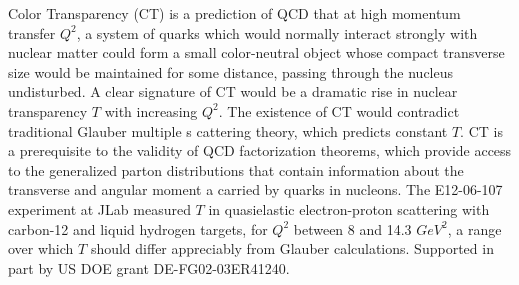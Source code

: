 \noindent
Color Transparency (CT) is a prediction of QCD that at high momentum transfer
$Q ^2$, a system of quarks which would normally interact strongly with nuclear
matter could form a small color-neutral object whose compact transverse size
would be maintained for some distance, passing through the nucleus undisturbed.
A clear signature of CT would be a dramatic rise in nuclear transparency $T$
with increasing $Q^2$. The existence of CT would contradict traditional Glauber
multiple s cattering theory, which predicts constant $T$. CT is a prerequisite
to the validity of QCD factorization theorems, which provide access to the
generalized parton distributions that contain information about the transverse
and angular moment a carried by quarks in nucleons. The E12-06-107 experiment
at JLab measured $T$ in quasielastic electron-proton scattering with carbon-12
and liquid hydrogen targets, for $Q^2$ between 8 and 14.3 $GeV^2$, a range over
which $T$ should differ appreciably from Glauber calculations. Supported in
part by US DOE grant DE-FG02-03ER41240.
